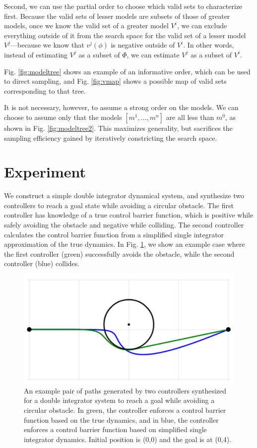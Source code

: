 \documentclass[letterpaper, 10 pt, conference]{ieeeconf}  %
\begin{document}
Second, we can use the partial order to choose which valid sets to characterize first. Because the valid sets of lesser models are subsets of those of greater models, once we know the valid set of a greater model $V^i$, we can exclude everything outside of it from the search space for the valid set of a lesser model $V^j$---because we know that $v^j(\phi)$ is negative outside of $V^i$. In other words, instead of estimating $V^j$ as a subset of $\Phi$, we can estimate $V^j$ as a subset of $V^i$.

Fig. \ref{fig:modeltree} shows an example of an informative order, which can be used to direct sampling, and Fig. \ref{fig:vmap} shows a possible map of valid sets corresponding to that tree.

It is not necessary, however, to assume a strong order on the models. We can choose to assume only that the models $[m^1,...,m^n]$ are all less than $m^0$, as shown in Fig. \ref{fig:modeltree2}. This maximizes generality, but sacrifices the sampling efficiency gained by iteratively constricting the search space.

\section{Experiment}

We construct a simple double integrator dynamical system, and synthesize two controllers to reach a goal state while avoiding a circular obstacle. The first controller has knowledge of a true control barrier function, which is positive while safely avoiding the obstacle and negative while colliding. The second controller calculates the control barrier function from a simplified single integrator approximation of the true dynamics. In Fig. \ref{fig:expdemo}, we show an example case where the first controller (green) successfully avoids the obstacle, while the second controller (blue) collides.

\begin{figure}[htbp]
        \centerline{\includegraphics[width=0.9\columnwidth]{img/exp_demo.png}}
        \caption{An example pair of paths generated by two controllers synthesized for a double integrator system to reach a goal while avoiding a circular obstacle. In green, the controller enforces a control barrier function based on the true dynamics, and in blue, the controller enforces a control barrier function based on simplified single integrator dynamics. Initial position is (0,0) and the goal is at (0,4).}
        \label{fig:expdemo}
\end{figure}
\end{document}
